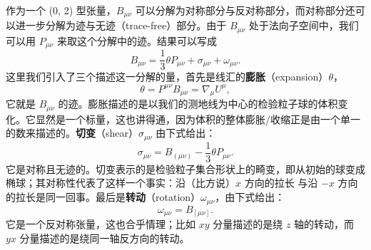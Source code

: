 作为一个 (0, 2) 型张量，$B_{\mu\nu}$ 可以分解为对称部分与反对称部分，而对称部分还可以进一步分解为迹与无迹（trace-free）部分。由于 $B_{\mu\nu}$ 处于法向子空间中，我们可以用 $P_{\mu\nu}$ 来取这个分解中的迹。结果可以写成
\begin{equation*}
B_{\mu\nu} = \frac{1}{3}\theta P_{\mu\nu} + \sigma_{\mu\nu} + \omega_{\mu\nu}.
\tag{F.6}
\end{equation*}
这里我们引入了三个描述这一分解的量，首先是线汇的\textbf{膨胀}（expansion）$\theta$，
\begin{equation*}
\theta = P^{\mu\nu}B_{\mu\nu} = \nabla_\mu U^\mu,
\tag{F.7}
\end{equation*}
它就是 $B_{\mu\nu}$ 的迹。膨胀描述的是以我们的测地线为中心的检验粒子球的体积变化。它显然是一个标量，这也讲得通，因为体积的整体膨胀/收缩正是由一个单一的数来描述的。\textbf{切变}（shear）$\sigma_{\mu\nu}$ 由下式给出：
\begin{equation*}
\sigma_{\mu\nu} = B_{(\mu\nu)} - \frac{1}{3}\theta P_{\mu\nu}.
\tag{F.8}
\end{equation*}
它是对称且无迹的。切变表示的是检验粒子集合形状上的畸变，即从初始的球变成椭球；其对称性代表了这样一个事实：沿（比方说）$x$ 方向的拉长%
与沿 $-x$ 方向的拉长是同一回事。最后是\textbf{转动}（rotation）$\omega_{\mu\nu}$，由下式给出：
\begin{equation*}
\omega_{\mu\nu} = B_{[\mu\nu]}.
\tag{F.9}
\end{equation*}
它是一个反对称张量，这也合乎情理；比如 $xy$ 分量描述的是绕 $z$ 轴的转动，而 $yx$ 分量描述的是绕同一轴反方向的转动。

